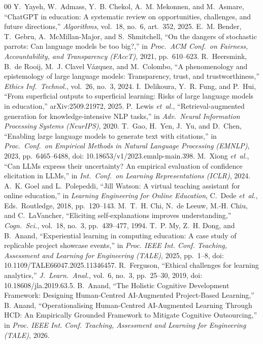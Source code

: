 \documentclass[conference]{IEEEtran}
\begin{document}
\begin{thebibliography}{00}
 Y.~Yayeh, W.~Admass, Y.~B. Chekol, A.~M. Mekonnen, and M.~Asmare, ``ChatGPT in education: A systematic review on opportunities, challenges, and future directions,'' \emph{Algorithms}, vol.~18, no.~6, art.~352, 2025.
 E.~M. Bender, T.~Gebru, A.~McMillan-Major, and S.~Shmitchell, ``On the dangers of stochastic parrots: Can language models be too big?,'' in \emph{Proc.\ ACM Conf.\ on Fairness, Accountability, and Transparency (FAccT)}, 2021, pp.~610--623.
 R.~Heersmink, B.~de Rooij, M.~J. Clavel V\'azquez, and M.~Colombo, ``A phenomenology and epistemology of large language models: Transparency, trust, and trustworthiness,'' \emph{Ethics Inf.\ Technol.}, vol.~26, no.~3, 2024.
 I.~Delikoura, Y.~R. Fung, and P.~Hui, ``From superficial outputs to superficial learning: Risks of large language models in education,'' arXiv:2509.21972, 2025.
 P.~Lewis \emph{et~al.}, ``Retrieval-augmented generation for knowledge-intensive NLP tasks,'' in \emph{Adv.\ Neural Information Processing Systems (NeurIPS)}, 2020.
 T.~Gao, H.~Yen, J.~Yu, and D.~Chen, ``Enabling large language models to generate text with citations,'' in \emph{Proc.\ Conf.\ on Empirical Methods in Natural Language Processing (EMNLP)}, 2023, pp.~6465--6488, doi: 10.18653/v1/2023.emnlp-main.398.
 M.~Xiong \emph{et~al.}, ``Can LLMs express their uncertainty? An empirical evaluation of confidence elicitation in LLMs,'' in \emph{Int.\ Conf.\ on Learning Representations (ICLR)}, 2024.
 A.~K. Goel and L.~Polepeddi, ``Jill Watson: A virtual teaching assistant for online education,'' in \emph{Learning Engineering for Online Education}, C.~Dede \emph{et~al.}, Eds.\ Routledge, 2018, pp.~120--143.
 M.~T.~H. Chi, N.~de Leeuw, M.-H. Chiu, and C.~LaVancher, ``Eliciting self-explanations improves understanding,'' \emph{Cogn.\ Sci.}, vol.~18, no.~3, pp.~439--477, 1994.
 T.~P. My, Z.~H. Dong, and B.~Anand, ``Experiential learning in computing education: A case study of replicable project showcase events,'' in \emph{Proc. IEEE Int. Conf. Teaching, Assessment and Learning for Engineering (TALE)}, 2025, pp.~1--8, doi: 10.1109/TALE66047.2025.11346457.
 R.~Ferguson, ``Ethical challenges for learning analytics,'' \emph{J.~Learn.~Anal.}, vol.~6, no.~3, pp.~25--30, 2019, doi: 10.18608/jla.2019.63.5.
 B.~Anand, ``The Holistic Cognitive Development Framework: Designing Human-Centred AI-Augmented Project-Based Learning,''
 B. Anand, ``Operationalising Human-Centred AI-Augmented Learning Through HCD: An Empirically Grounded Framework to Mitigate Cognitive Outsourcing,'' in \emph{Proc. IEEE Int. Conf. Teaching, Assessment and Learning for Engineering (TALE)}, 2026.
\end{thebibliography}
\end{document}
